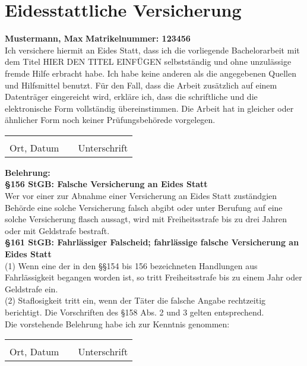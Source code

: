\section{Eidesstattliche Versicherung}
\vspace{1cm}
\flushleft
\large
\textbf{Mustermann, Max}
\hfill
\textbf{Matrikelnummer: 123456}\\
\vspace{1cm}
\large
Ich versichere hiermit an Eides Statt, dass ich die vorliegende Bachelorarbeit mit dem Titel HIER DEN TITEL EINFÜGEN selbstständig und ohne unzulässige fremde Hilfe erbracht habe. Ich habe keine anderen als die angegebenen Quellen und Hilfsmittel benutzt. Für den Fall, dass die Arbeit zusätzlich auf einem Datenträger eingereicht wird, erkläre ich, dass die schriftliche und die elektronische Form vollständig übereinstimmen. Die Arbeit hat in gleicher oder ähnlicher Form noch keiner Prüfungsbehörede vorgelegen.\\
\vspace{1.75cm}
\begin{tabular}{lll}
	\makebox[5cm]{\hrulefill}  & \hspace{4.75cm} & \makebox[5cm]{\hrulefill}\\
	Ort, Datum & \hspace{4.75cm} & Unterschrift	
\end{tabular}
\vfill
\small
\textbf{Belehrung:}\\
\textbf{\S 156 StGB: Falsche Versicherung an Eides Statt}\\
Wer vor einer zur Abnahme einer Versicherung an Eides Statt zuständgien Behörde eine solche Versicherung falsch abgibt oder unter Berufung auf eine solche Versicherung flasch aussagt, wird mit Freiheitsstrafe bis zu drei Jahren oder mit Geldstrafe bestraft.\\
\vspace{0.5cm}
\textbf{\S 161 StGB: Fahrlässiger Falscheid; fahrlässige falsche Versicherung an Eides Statt}\\
(1) Wenn eine der in den \S\S 154 bis 156 bezeichneten Handlungen aus Fahrlässigkeit begangen worden ist, so tritt Freiheitsstrafe bis zu einem Jahr oder Geldstrafe ein.\\
(2) Staflosigkeit tritt ein, wenn der Täter die falsche Angabe rechtzeitig berichtigt. Die Vorschriften des \S 158 Abs. 2 und 3 gelten entsprechend.\\
\large
\vspace{0.2cm}
Die vorstehende Belehrung habe ich zur Kenntnis genommen:\\
\vspace{1.75cm}
\begin{tabular}{lll}
	\makebox[5cm]{\hrulefill}  & \hspace{4.75cm} & \makebox[5cm]{\hrulefill}\\
	Ort, Datum & \hspace{4.75cm} & Unterschrift	
\end{tabular}

